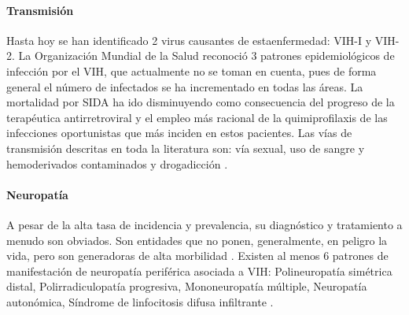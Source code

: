 \documentclass[a4paper,twocolumn,10pt]{article}
\begin{document}
\paragraph{Transmisión}
Hasta hoy se han identificado 2 virus causantes de estaenfermedad: VIH-I y VIH-2. La Organización Mundial de la Salud reconoció 3 patrones epidemiológicos de infección por el VIH, que actualmente no se toman en cuenta, pues de forma general el número de infectados se ha incrementado en todas las áreas. La mortalidad por SIDA ha ido disminuyendo como consecuencia del progreso de la terapéutica antirretroviral y el empleo más racional de la quimiprofilaxis de las infecciones oportunistas que más inciden en estos pacientes. Las vías de transmisión descritas en toda la literatura son: vía sexual, uso de sangre y hemoderivados contaminados  y drogadicción \cite{Castillo2004}.
\paragraph{Neuropatía} 
A pesar de la alta tasa de incidencia y prevalencia, su diagnóstico y tratamiento a menudo son obviados. Son entidades que no ponen, generalmente, en peligro la vida, pero son generadoras de alta morbilidad \cite{Ferri2002}. \newline \newline
Existen al menos 6 patrones de manifestación de neuropatía periférica asociada a VIH: Polineuropatía simétrica distal, Polirradiculopatía progresiva, Mononeuropatía múltiple, Neuropatía autonómica, Síndrome de linfocitosis difusa infiltrante \cite{Ferri2002}.
\end{document}
